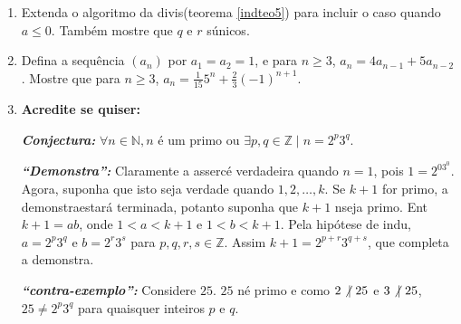 \begin{enumerate}[{\bf 1.}]
\item Extenda o algoritmo da divis\ao (teorema \ref{indteo5}) para incluir o caso quando $a\leq 0$. Tamb\'em mostre que $q$ e $r$ s\ao \'unicos.

\item Defina a sequ\^encia $(a_n)$ por $a_1=a_2=1$, e para $n\geq 3$, $a_n=4a_{n-1}+5a_{n-2}$. Mostre que para $n\geq 3$, $a_n=\frac{1}{15}5^n+\frac{2}{3}(-1)^{n+1}$.

\item {\bf Acredite se quiser:}  

\noindent \textit{\textbf{Conjectura:}} $\forall n\in\mathbb{N}, n$ \'e um primo ou $\exists p,q\in\mathbb{Z} \mid  n=2^p3^q$. 

\noindent \textit{\textbf{``Demonstra\caoi'':}} Claramente a asserc\ao \'e verdadeira quando $n=1$, pois $1=2^03^0$. Agora, suponha que isto seja verdade quando $1,2,\ldots,k$. Se $k+1$ for primo, a demonstra\cao estar\'a terminada, potanto suponha que $k+1$ n\ao seja primo. Ent\ao $k+1=ab$, onde $1<a<k+1$ e $1<b<k+1$. Pela hip\'otese de indu\caoi, $a=2^p3^q$ e $b=2^r3^s$ para $p,q,r,s\in\mathbb{Z}$. Assim $k+1=2^{p+r}3^{q+s}$, que completa a demonstra\caoi.

\noindent \textit{\textbf{``contra-exemplo'':}} Considere $25$. $25$ n\ao \'e primo e como $2\not|\textrm{ } 25$ e $3\not|\textrm{ } 25$, $25\neq 2^p3^q$ para quaisquer inteiros $p$ e $q$.
\end{enumerate}

